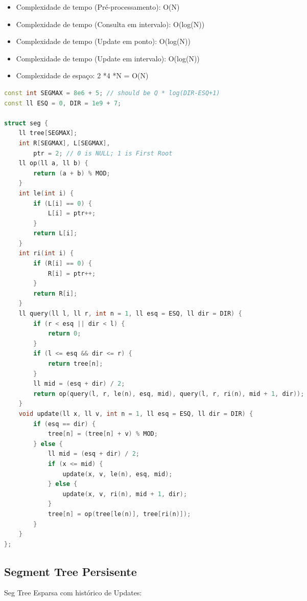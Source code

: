 \documentclass[11pt, a4paper, oneside]{book}
\begin{document}
\begin{itemize}
\item Complexidade de tempo (Pré-processamento): O(N)
\item Complexidade de tempo (Consulta em intervalo): O(log(N))
\item Complexidade de tempo (Update em ponto): O(log(N))
\item Complexidade de tempo (Update em intervalo): O(log(N))
\item Complexidade de espaço: 2 *4 *N = O(N)
\end{itemize}

\hfill

\begin{multicols}{2}
\begin{lstlisting}[language=C++]
const int SEGMAX = 8e6 + 5; // should be Q * log(DIR-ESQ+1)
const ll ESQ = 0, DIR = 1e9 + 7;

struct seg {
    ll tree[SEGMAX];
    int R[SEGMAX], L[SEGMAX],
        ptr = 2; // 0 is NULL; 1 is First Root
    ll op(ll a, ll b) {
        return (a + b) % MOD;
    }
    int le(int i) {
        if (L[i] == 0) {
            L[i] = ptr++;
        }
        return L[i];
    }
    int ri(int i) {
        if (R[i] == 0) {
            R[i] = ptr++;
        }
        return R[i];
    }
    ll query(ll l, ll r, int n = 1, ll esq = ESQ, ll dir = DIR) {
        if (r < esq || dir < l) {
            return 0;
        }
        if (l <= esq && dir <= r) {
            return tree[n];
        }
        ll mid = (esq + dir) / 2;
        return op(query(l, r, le(n), esq, mid), query(l, r, ri(n), mid + 1, dir));
    }
    void update(ll x, ll v, int n = 1, ll esq = ESQ, ll dir = DIR) {
        if (esq == dir) {
            tree[n] = (tree[n] + v) % MOD;
        } else {
            ll mid = (esq + dir) / 2;
            if (x <= mid) {
                update(x, v, le(n), esq, mid);
            } else {
                update(x, v, ri(n), mid + 1, dir);
            }
            tree[n] = op(tree[le(n)], tree[ri(n)]);
        }
    }
};
\end{lstlisting}
\end{multicols}

\hfill

\subsection{Segment Tree Persisente}


Seg Tree Esparsa com histórico de Updates:
\end{document}

